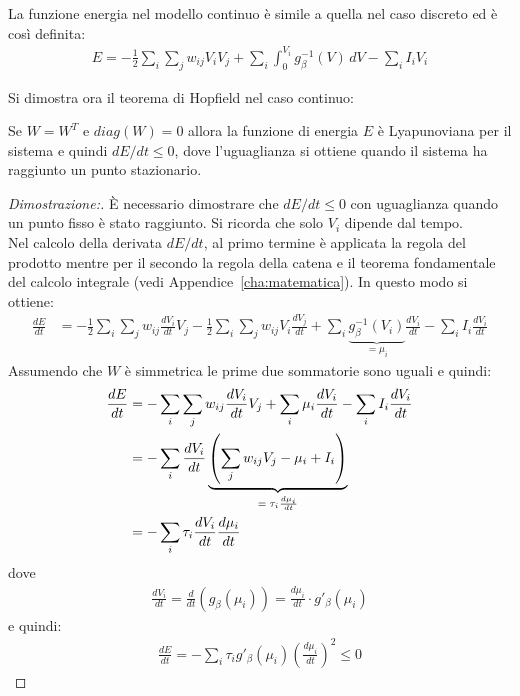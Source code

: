 \newpage

La funzione energia nel modello continuo è simile a quella nel caso discreto ed è così definita:
\begin{align}
    E = - \frac{1}{2} \sum_i \sum_j w_{ij} V_i V_j + \sum_i \int_0^{V_i} g^{-1}_\beta (V) \, dV - \sum_i I_i V_i
\end{align}

Si dimostra ora il teorema di Hopfield nel caso continuo: 
\begin{thm}
	Se $W=W^T$ e $diag(W) = 0$ allora la funzione di energia $E$ è Lyapunoviana per il sistema e quindi $dE / dt \leq 0$, dove l'uguaglianza si ottiene quando il sistema ha raggiunto un punto stazionario.
\end{thm}

\begin{proof}[Dimostrazione:]
	È necessario dimostrare che $dE / dt \leq 0$ con uguaglianza quando un punto fisso è stato raggiunto. Si ricorda che solo $V_i$ dipende dal tempo.\\
	
	Nel calcolo della derivata $dE / dt$, al primo termine è applicata la regola del prodotto mentre per il secondo la regola della catena e il teorema fondamentale del calcolo integrale (vedi Appendice~\ref{cha:matematica}). In questo modo si ottiene:
	\begin{align*}
        \frac{dE}{dt} &= - \frac{1}{2} \sum_i \sum_j w_{ij} \frac{dV_i}{dt} V_j - \frac{1}{2} \sum_i \sum_j w_{ij} V_i \frac{dV_j}{dt} + \sum_i \underbrace{g_\beta^{-1}(V_i)}_\textrm{$= \mu_i$} \frac{dV_i}{dt} - \sum_i I_i \frac{d V_i}{dt} 
	\end{align*}
	Assumendo che $W$ è simmetrica le prime due sommatorie sono uguali e quindi:
	\begin{align*}
        \frac{dE}{dt} &=  - \sum_i \sum_j w_{ij} \frac{dV_i}{dt} V_j + \sum_i \mu_i \frac{dV_i}{dt} - \sum_i I_i \frac{d V_i}{dt} \\
		&= - \sum_i \frac{d V_i}{dt} \underbrace{\left(\sum_j w_{ij} V_j - \mu_i + I_i \right)}_\textrm{$ = \tau_i \frac{d \mu_i}{dt}$} \\
        &= - \sum_i \tau_i \frac{d V_i}{dt} \frac{d \mu_i}{dt}
	\end{align*}
	dove
	\begin{align*}
		\frac{d V_i}{dt} = \frac{d}{dt} \left(g_\beta (\mu_i) \right) = \frac{d \mu_i}{dt} \cdot g'_\beta(\mu_i)
	\end{align*}
	e quindi:
	\begin{align*}
        \frac{dE}{dt} = - \sum_i \tau_i g'_\beta(\mu_i) \left(\frac{d\mu_i}{dt} \right)^2 \leq 0
    \end{align*}
	

\end{proof}
